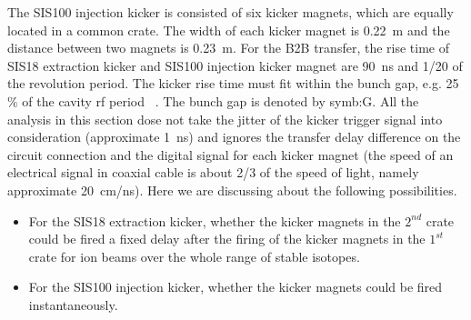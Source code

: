 The SIS100 injection kicker is consisted of six kicker magnets, which are equally located in a common crate. The width of each kicker magnet is \SI{0.22}{m} and the distance between two magnets is \SI{0.23}{m}. For the B2B transfer, the rise time of SIS18 extraction kicker and SIS100 injection kicker magnet are \SI{90}{ns} and 1/20 of the revolution period. The kicker rise time must fit within the bunch gap, e.g. 25$\%$ of the cavity rf period ~\cite{udo_injection_2014, liebermann_sis100_2013}. The bunch gap is denoted by \gls{symb:G}.  All the analysis in this section dose not take the jitter of the kicker trigger signal into consideration (approximate \SI{1}{ns}) and ignores the transfer delay difference on the circuit connection and the digital signal for each kicker magnet  (the speed of an electrical signal in coaxial cable is about 2/3 of the speed of light, namely approximate \SI{20}{cm/ns}). Here we are discussing about the following possibilities. 
\begin{itemize}
    \item For the SIS18 extraction kicker, whether the kicker magnets in the $2^{nd}$ crate could be fired a fixed delay after the firing of the kicker magnets in the $1^{st}$ crate for ion beams over the whole range of stable isotopes. 
    \item For the SIS100 injection kicker, whether the kicker magnets could be fired instantaneously. 
\end{itemize} 

